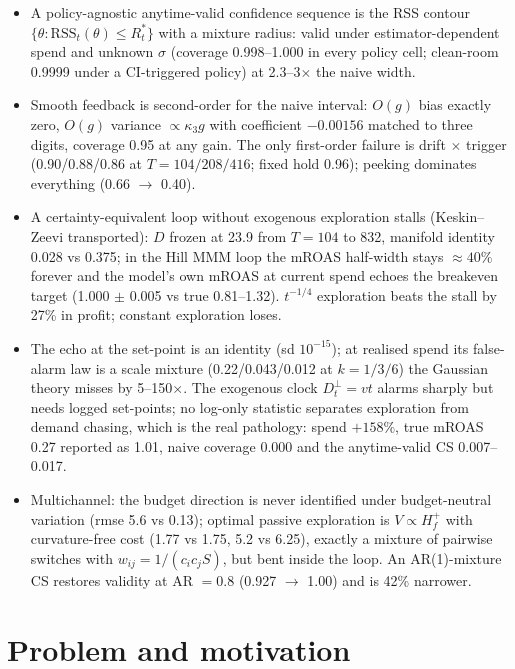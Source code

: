 \begin{keyideas}
\begin{itemize}
\item A policy-agnostic anytime-valid confidence sequence is the RSS contour $\{\theta : \mathrm{RSS}_t(\theta) \le R^*_t\}$ with a mixture radius: valid under estimator-dependent spend and unknown $\sigma$ (coverage 0.998--1.000 in every policy cell; clean-room 0.9999 under a CI-triggered policy) at 2.3--3$\times$ the naive width.
\item Smooth feedback is second-order for the naive interval: $O(g)$ bias exactly zero, $O(g)$ variance $\propto \kappa_3 g$ with coefficient $-0.00156$ matched to three digits, coverage 0.95 at any gain. The only first-order failure is drift $\times$ trigger (0.90/0.88/0.86 at $T = 104/208/416$; fixed hold 0.96); peeking dominates everything (0.66 $\to$ 0.40).
\item A certainty-equivalent loop without exogenous exploration stalls (Keskin--Zeevi transported): $D$ frozen at 23.9 from $T = 104$ to 832, manifold identity 0.028 vs 0.375; in the Hill MMM loop the mROAS half-width stays $\approx 40\%$ forever and the model's own mROAS at current spend echoes the breakeven target (1.000 $\pm$ 0.005 vs true 0.81--1.32). $t^{-1/4}$ exploration beats the stall by 27\% in profit; constant exploration loses.
\item The echo at the set-point is an identity (sd $10^{-15}$); at realised spend its false-alarm law is a scale mixture (0.22/0.043/0.012 at $k = 1/3/6$) the Gaussian theory misses by 5--150$\times$. The exogenous clock $D^\perp_t = vt$ alarms sharply but needs logged set-points; no log-only statistic separates exploration from demand chasing, which is the real pathology: spend $+158\%$, true mROAS 0.27 reported as 1.01, naive coverage 0.000 and the anytime-valid CS 0.007--0.017.
\item Multichannel: the budget direction is never identified under budget-neutral variation (rmse 5.6 vs 0.13); optimal passive exploration is $V \propto H_f^+$ with curvature-free cost (1.77 vs 1.75, 5.2 vs 6.25), exactly a mixture of pairwise switches with $w_{ij} = 1/(c_ic_jS)$, but bent inside the loop. An AR(1)-mixture CS restores validity at AR $= 0.8$ (0.927 $\to$ 1.00) and is 42\% narrower.
\end{itemize}
\end{keyideas}

\section{Problem and motivation}

